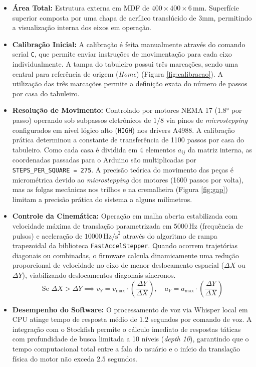 \documentclass[11pt,a4paper]{article}
\begin{document}
\begin{itemize}
    \item \textbf{Área Total:} Estrutura externa em MDF de $400 \times 400 \times 6\,\text{mm}$. Superfície superior composta por uma chapa de acrílico translúcido de 3mm, permitindo a visualização interna dos eixos em operação.
    \item \textbf{Calibração Inicial:} A calibração é feita manualmente através do comando serial \texttt{C}, que permite enviar instruções de movimentação para cada eixo individualmente. A tampa do tabuleiro possui três marcações, sendo uma central para referência de origem (\textit{Home}) (Figura \ref{fig:calibracao}). A utilização das três marcações permite a definição exata do número de passos por casa do tabuleiro.
    \item \textbf{Resolução de Movimento:} Controlado por motores NEMA 17 (1.8° por passo) operando sob subpassos eletrônicos de $1/8$ via pinos de \textit{microstepping} configurados em nível lógico alto (\lstinline{HIGH}) nos drivers A4988. A calibração prática determinou a constante de transferência de 1100 passos por casa do tabuleiro. Como cada casa é dividida em 4 elementos $a_{ij}$ da matriz interna, as coordenadas passadas para o Arduino são multiplicadas por \lstinline{STEPS_PER_SQUARE = 275}. A precisão teórica do movimento das peças é micrométrica devido ao \textit{microstepping} dos motores (1600 passos por volta), mas as folgas mecânicas nos trilhos e na cremalheira (Figura \ref{fig:gap}) limitam a precisão prática do sistema a alguns milímetros. 
    \item \textbf{Controle da Cinemática:} Operação em malha aberta estabilizada com velocidade máxima de translação parametrizada em $5000\,\text{Hz}$ (frequência de pulsos) e aceleração de $10000\,\text{Hz/s}^2$ através do algoritmo de rampa trapezoidal da biblioteca \texttt{FastAccelStepper}. Quando ocorrem trajetórias diagonais ou combinadas, o firmware calcula dinamicamente uma redução proporcional de velocidade no eixo de menor deslocamento espacial ($\Delta X$ ou $\Delta Y$), viabilizando deslocamentos diagonais síncronos.
    \begin{equation}
        \text{Se } \Delta X > \Delta Y \implies v_Y = v_{\text{max}} \cdot \left(\frac{\Delta Y}{\Delta X}\right), \quad a_Y = a_{\text{max}} \cdot \left(\frac{\Delta Y}{\Delta X}\right)
    \end{equation}
    \item \textbf{Desempenho do Software:} O processamento de voz via Whisper local em CPU atinge tempo de resposta médio de $1.2$ segundos por comando de voz. A integração com o Stockfish permite o cálculo imediato de respostas táticas com profundidade de busca limitada a 10 níveis (\textit{depth 10}), garantindo que o tempo computacional total entre a fala do usuário e o início da translação física do motor não exceda $2.5$ segundos.
\end{itemize}
\end{document}
